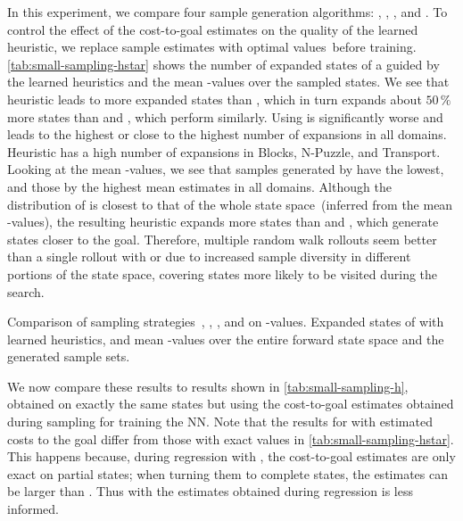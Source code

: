 In this experiment, we compare four sample generation algorithms: \bfs, \dfs, \rw, and \bfsrw. To control the effect of the cost-to-goal estimates on the quality of the learned heuristic, we replace sample estimates with optimal values~\hstar before training. \cref{tab:small-sampling-hstar} shows the number of expanded states of a \gbfs guided by the learned heuristics and the mean \hstar-values over the sampled states. We see that heuristic \hnnl{\bfs} leads to more expanded states than \hnnl{\dfs}, which in turn expands about $50\,\%$ more states than \hnnl{\rw} and \hnnl{\bfsrw}, which perform similarly. Using \hnnl{\bfs} is significantly worse and leads to the highest or close to the highest number of expansions in all domains. Heuristic \hnnl{\dfs} has a high number of expansions in Blocks, N-Puzzle, and Transport. Looking at the mean \hstar-values, we see that samples generated by \bfs have the lowest, and those by \dfs the highest mean estimates in all domains. Although the distribution of \dfs is closest to that of the whole state space~(inferred from the mean \hstar-values), the resulting heuristic expands more states than \rw and \bfsrw, which generate states closer to the goal. Therefore, multiple random walk rollouts seem better than a single rollout with \bfs or \dfs due to increased sample diversity in different portions of the state space, covering states more likely to be visited during the search.

\begin{table}[ht]
    \caption[Comparison of sampling strategies on \hstar-values.]{Comparison of sampling strategies~\bfs, \dfs, \rw, and \bfsrw on \hstar-values. Expanded states of \gbfs with learned heuristics, and mean \hstar-values over the entire forward state space and the generated sample sets.}
    \label{tab:small-sampling-hstar}
    \addmargin
    \centering
    
\end{table}

We now compare these results to results shown in \cref{tab:small-sampling-h}, obtained on exactly the same states but using the cost-to-goal estimates obtained during sampling for training the NN. Note that the results for \bfs with estimated costs to the goal differ from those with exact values in \cref{tab:small-sampling-hstar}. This happens because, during regression with \bfs, the cost-to-goal estimates are only exact on partial states; when turning them to complete states, the estimates can be larger than \hstar. Thus \hnnl{\bfs} with the estimates obtained during regression is less informed.

